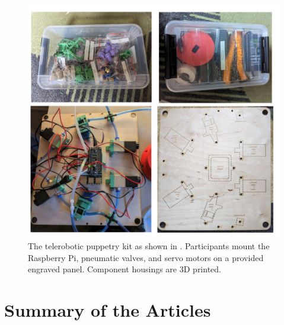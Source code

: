 \documentclass[dissertation,math,vertlayout,pdfa,colorlinks,nologo]{aaltoseries}
\begin{document}
\begin{figure}
    \centering
    \includegraphics[width=1\linewidth]{puppetry-kit.png}
    \caption{The telerobotic puppetry kit as shown in \cite{peledTeleroboticTheaterOppressed2025}. Participants mount the Raspberry Pi, pneumatic valves, and servo motors on a provided engraved panel. Component housings are 3D printed.}
    \label{fig:telepupetry-kit}
\end{figure}

\chapter{Summary of the Articles}
\end{document}
